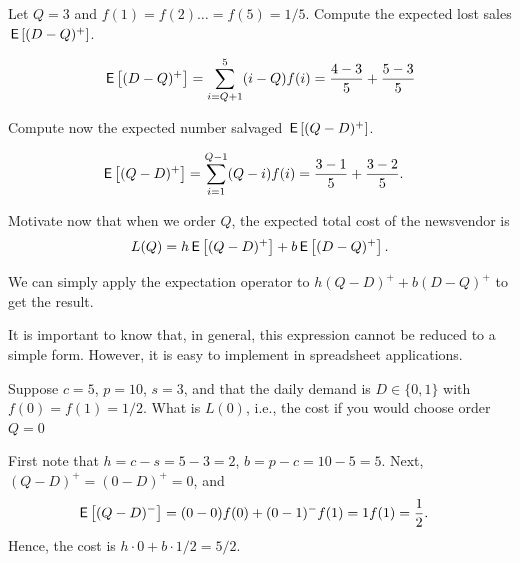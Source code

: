 \begin{exercise}
  Let $Q=3$ and  $f(1)=f(2)\ldots=f(5) = 1/5$. Compute the expected lost sales $\,\mathsf{E}\left[(D-Q)^+\right]$.
  \begin{solution}
    \begin{align*}
      \,\mathsf{E}\left[(D-Q)^+\right] &= \sum_{i=Q+1}^5 (i-Q) f(i) = \frac{4-3}5 + \frac{5-3}5\\
    \end{align*}
  \end{solution}
\end{exercise}

\begin{exercise}[continuation]
 Compute now the expected number salvaged $\,\mathsf{E}\left[(Q-D)^+\right]$.
  \begin{solution}
    \begin{align*}
      \,\mathsf{E}\left[(Q-D)^+\right] &= \sum_{i=1}^{Q-1} (Q-i) f(i) = \frac{3-1}5 + \frac{3-2}5.
    \end{align*}
  \end{solution}
\end{exercise}


\begin{exercise}
Motivate now that when we order $Q$, the expected total cost of the newsvendor is 
\begin{align}\label{eq:59}
L(Q) = h\,\mathsf{E}\left[(Q-D)^+\right] + b\,\mathsf{E}\left[(D-Q)^+\right].
\end{align}
\begin{solution}
We can  simply apply the expectation operator to $h(Q-D)^+ + b(D-Q)^+$ to get the result.

It is important to know that, in general, this expression cannot be reduced to a simple form. However, it is easy to implement in spreadsheet applications.
\end{solution}
\end{exercise}

\begin{exercise}
Suppose $c = 5$, $p=10$, $s=3$,  and that the daily demand is $D\in \{0,1\}$ with $f(0) = f(1) =1/2$. What is $L(0)$, i.e., the cost if you would choose order $Q=0$ 
\begin{solution}
First note that $h=c-s=5-3=2$, $b=p-c=10-5=5$. Next, $(Q-D)^+=(0-D)^+=0$, and
\begin{align*}
  \,\mathsf{E}\left[(Q-D)^-\right]
&= (0-0)f(0) + (0-1)^-f(1) = 1f(1) = \frac 1 2.
\end{align*}
Hence, the cost is $h\cdot 0 + b \cdot 1/2 = 5/2$.
\end{solution}
\end{exercise}

